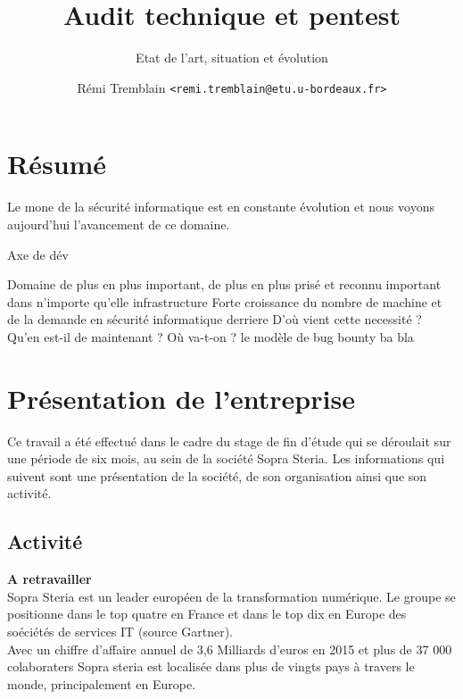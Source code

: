 \documentclass[a4paper]{memoir}
\title{Audit technique et pentest}
\subtitle{Etat de l'art, situation et évolution}
\author{Rémi Tremblain \texttt{<remi.tremblain@etu.u-bordeaux.fr>}}
\begin{document}
\frontmatter%
\maketitle
\thispagestyle{empty}



\chapter*{Résumé}

 Le mone de la sécurité informatique est en constante évolution et nous voyons aujourd'hui l'avancement de ce domaine.

Axe de dév

Domaine de plus en plus important, de plus en plus prisé et reconnu
important dans n'importe qu'elle infrastructure 
Forte croissance du nombre de machine et de la demande en sécurité informatique derriere 
D'où vient cette necessité ? Qu'en est-il de maintenant ? Où va-t-on ? le modèle de bug bounty ba bla


\chapter*{Présentation de l'entreprise}

Ce travail a été effectué dans le cadre du stage de fin d'étude qui se déroulait sur une période de six mois, au sein de la société Sopra Steria.
Les informations qui suivent sont une présentation de la société, de son organisation ainsi que son activité.

\section{Activité}

\textbf{A retravailler}\\

Sopra Steria est un leader européen de la transformation numérique. Le groupe se positionne dans le top quatre en France et dans le top dix en Europe des soéciétés de services IT (source Gartner).\\
Avec un chiffre d'affaire annuel de 3,6 Milliards d'euros en 2015 et plus de 37 000 colaboraters Sopra steria est localisée dans plus de vingts pays à travers le monde, principalement en Europe.\\
\end{document}
